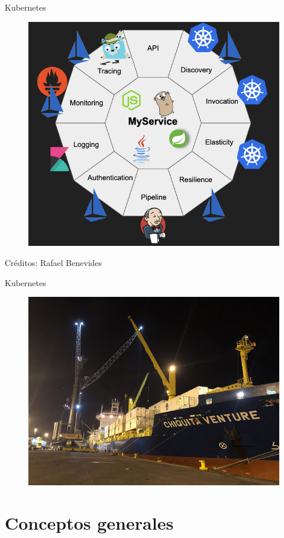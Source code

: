 \documentclass[aspectratio=169]{beamer}
\begin{document}
\begin{frame}{Kubernetes}
    \begin{figure}
        \centering
        \includegraphics[width=0.5\linewidth]{Images/kube3.png}
        \label{fig:container}
    \end{figure}

    Créditos: Rafael Benevides
\end{frame}

\begin{frame}{Kubernetes}
    \begin{figure}
        \centering
        \includegraphics[width=0.8\linewidth]{Images/kubquetzal}
    \end{figure}
\end{frame}

{
    \section{Conceptos generales}
}
\end{document}
